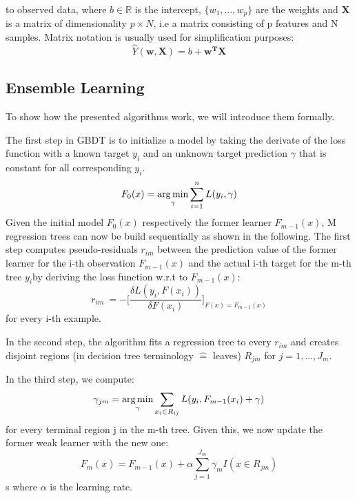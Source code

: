 to observed data, where $b \in \mathbb{R}$ is the intercept, $\{w_1, \dots, w_p\}$ are the weights and $\mathbf{X}$ is a matrix of dimensionality $p \times N$, i.e a matrix consisting of p features and N samples. Matrix notation is usually used for simplification purposes: 
\begin{equation}
	\hat Y(\mathbf{w},\mathbf{X}) = b + \mathbf{w^T}\mathbf{X}
\end{equation}

\subsection{Ensemble Learning}

To show how the presented algorithms work, we will introduce them formally.

The first step in GBDT is to initialize a model by taking the derivate of the loss function with a known target $ y_i $ and an unknown target prediction $ \gamma $ that is constant for all corresponding $ y_i $.
\begin{equation}
F_{0}(x) =  \operatorname*{arg\,min}_{\gamma} \sum_{i=1}^n L(y_i,\gamma) \label{gbdt_step1}
\end{equation}
Given the initial model $ F_0(x) $ respectively the former learner $ F_{m-1}(x) $, M regression trees can now be build sequentially as shown in the following. 
The first step computes pseudo-residuals $ r_{im} $ between the prediction value of the former learner for the i-th observation $ F_{m-1}(x) $ and the actual i-th target for the m-th tree $ y_i $by deriving the loss function w.r.t to $ F_{m-1}(x) $: 
\begin{equation}
	r_{im}\ = - \bigg[\dfrac{\delta L(y_i, F(x_i))}{\delta F(x_i)}\bigg]_{F(x) = F_{m-1}(x)}
\end{equation} 
for every i-th example.

In the second step, the algorithm fits a regression tree to every $ r_{im} $ and creates disjoint regions (in decision tree terminology $\widehat{=}$ \glqq leaves\grqq) $ R_{jm} $ for $j = 1, ..., J_m$. 

In the third step, we compute: 
\begin{equation}
	\gamma_{jm} = \operatorname*{arg\,min}_{\gamma} \sum_{x_i \in R_{ij}} L(y_i, F_{m-1}(x_i) + \gamma)
\end{equation}
for every terminal region j in the m-th tree. 
Given this, we now update the former weak learner with the new one:
\begin{equation}
	F_m(x) = F_{m-1}(x) + \alpha \sum_{j=1}^{J_m} \gamma_{m}I(x \in R_{jm})
\end{equation}s
where $ \alpha $ is the learning rate.



